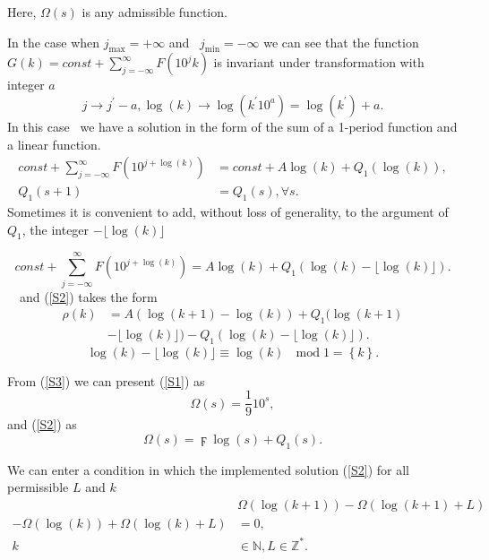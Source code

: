 \documentclass[titlepage,fleqn]{article}%
\providecommand{\U}[1]{\protect\rule{.1in}{.1in}}
\begin{document}
\noindent Here, $\Omega(s)$ is any admissible function.

In the case when $j_{\max}=+\infty$ and \ $j_{\min}=-\infty$ we can see that
the function $G(k)=const+%
{\displaystyle\sum\limits_{j=-\infty}^{\infty}}
F(10^{j}k)$ is invariant under transformation with integer $a$
\[
j\rightarrow j^{\prime}-a,\log(k)\rightarrow\log(k^{\prime}10^{a}%
)=\log(k^{\prime})+a.
\]
In this case \ we have a solution in the form of the sum of a 1-period
function and a linear function.%
\begin{align*}
const+%
{\displaystyle\sum\limits_{j=-\infty}^{\infty}}
F(10^{j+\log(k)})  &  =const+A\log(k)+Q_{1}(\log(k)),\\
Q_{1}(s+1)  &  =Q_{1}(s),\forall s.\text{ }%
\end{align*}
Sometimes it is convenient to add, without loss of generality, to the argument
of $Q_{1}$, the integer $-\lfloor\log(k)\rfloor$%

\[
const+%
{\displaystyle\sum\limits_{j=-\infty}^{\infty}}
F(10^{j+\log(k)})=A\log(k)+Q_{1}(\log(k)-\lfloor\log(k)\rfloor).
\]
\ \ and (\ref{S2}) takes the form%
\begin{align}
\rho(k)  &  =A\left(  \log(k+1)-\log(k)\right)  +Q_{1}(\log(k+1)\label{S2a}\\
&  -\lfloor\log(k)\rfloor)-Q_{1}(\log(k)-\lfloor\log(k)\rfloor).\nonumber
\end{align}%
\[
\log(k)-\lfloor\log(k)\rfloor\equiv\log(k)\text{ }\operatorname{mod}\text{
}1=\left\{  k\right\}  .
\]


From (\ref{S3}) we can present (\ref{S1}) as%
\[
\Omega(s)=\frac{1}{9}10^{s},
\]
and (\ref{S2}) as%
\begin{equation}
\Omega(s)=\digamma\log(s)+Q_{1}(s). \label{S2b}%
\end{equation}


We can enter a condition in which the implemented solution (\ref{S2}) for all
permissible $L$ and $k$%
\begin{align}
&  \Omega(\log(k+1))-\Omega(\log(k+1)+L)\label{S2c}\\
-\Omega(\log(k))+\Omega(\log(k)+L) &  =0,\nonumber\\
k &  \in%
\mathbb{N}
,L\in%
\mathbb{Z}
^{\ast}.\nonumber
\end{align}
\end{document}
